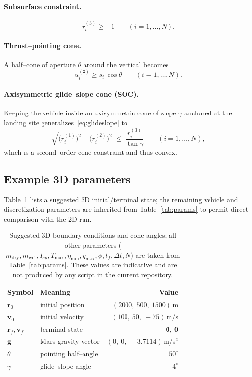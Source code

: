 \documentclass[11pt]{article}
\newcommand{\bv}[1]{\bm{#1}}
\begin{document}
\paragraph{Subsurface constraint.}
\begin{equation}
r_i^{(3)} \ge -1\qquad(i=1,\dots,N) .
\end{equation}

\paragraph{Thrust--pointing cone.}
A half--cone of aperture $\theta$ around the vertical becomes
\begin{equation}
u_i^{(3)} \ge s_i\,\cos\theta\qquad(i=1,\dots,N).
\end{equation}

\paragraph{Axisymmetric glide--slope cone (SOC).}
Keeping the vehicle inside an axisymmetric cone of slope $\gamma$
anchored at the landing site generalizes~\eqref{eq:glideslope} to
\begin{equation}
\sqrt{\bigl(r_i^{(1)}\bigr)^2+\bigl(r_i^{(2)}\bigr)^2}
  \;\le\; \frac{r_i^{(3)}}{\tan\gamma}
\qquad(i=1,\dots,N),
\label{eq:glideslope3d}
\end{equation}
which is a second--order cone constraint and thus convex.

\subsection{Example 3D parameters}

Table~\ref{tab:params3d} lists a suggested 3D initial/terminal
state; the remaining vehicle and discretization parameters are
inherited from Table~\ref{tab:params} to permit direct comparison
with the 2D run.

\begin{table}[h]
\centering
\begin{tabular}{llr}
\toprule
Symbol & Meaning & Value \\
\midrule
$\bv r_0$        & initial position      & $(2000,\ 500,\ 1500)$\,m \\
$\bv v_0$        & initial velocity      & $(100,\ 50,\ -75)$\,m/s \\
$\bv r_f,\bv v_f$& terminal state        & $\bv 0,\ \bv 0$ \\
$\bv g$          & Mars gravity vector   & $(0,\ 0,\ -3.7114)$\,m/s$^2$ \\
$\theta$         & pointing half--angle  & $50^\circ$ \\
$\gamma$         & glide--slope angle    & $4^\circ$ \\
\bottomrule
\end{tabular}
\caption{Suggested 3D boundary conditions and cone angles; all
other parameters ($m_{\text{dry}},m_{\text{wet}},I_{sp},T_{\max},
\eta_{\min},\eta_{\max},\phi,t_f,\Delta t,N$) are taken from
Table~\ref{tab:params}.  These values are indicative and are not
produced by any script in the current repository.}
\label{tab:params3d}
\end{table}
\end{document}
